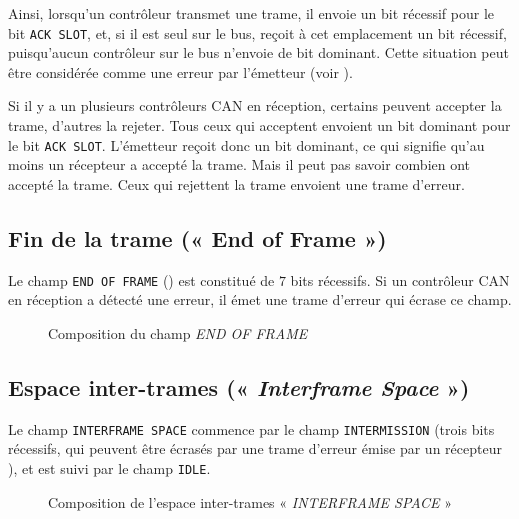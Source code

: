 Ainsi, lorsqu'un contrôleur transmet une trame, il envoie un bit récessif pour le bit \texttt{ACK SLOT}, et, si il est seul sur le bus, reçoit à cet emplacement un bit récessif, puisqu'aucun contrôleur sur le bus n'envoie de bit dominant. Cette situation peut être considérée comme une erreur par l'émetteur (voir \pasFini).

Si il y a un plusieurs contrôleurs CAN en réception, certains peuvent accepter la trame, d'autres la rejeter. Tous ceux qui acceptent envoient un bit dominant pour le bit \texttt{ACK SLOT}. L'émetteur reçoit donc un bit dominant, ce qui signifie qu'au moins un récepteur a accepté la trame. Mais il peut pas savoir combien ont accepté la trame. Ceux qui rejettent la trame envoient une trame d'erreur.




\subsection{Fin de la trame (« End of Frame »)}

Le champ \texttt{END OF FRAME} () est constitué de $7$ bits récessifs. Si un contrôleur CAN en réception a détecté une erreur, il émet une trame d'erreur qui écrase ce champ.


\begin{figure}[ht]
  \centering
  \caption{Composition du champ \emph{END OF FRAME}}
\end{figure}


\subsection{Espace inter-trames (« \emph{Interframe Space} »)}

Le champ \texttt{INTERFRAME SPACE} commence par le champ \texttt{INTERMISSION} (trois bits récessifs, qui peuvent être écrasés par une trame d'erreur émise par un récepteur \pasFini), et est suivi par le champ \texttt{IDLE}.

\begin{figure}[ht]
  \centering
  \caption{Composition de l'espace inter-trames « \emph{INTERFRAME SPACE} »}
\end{figure}

